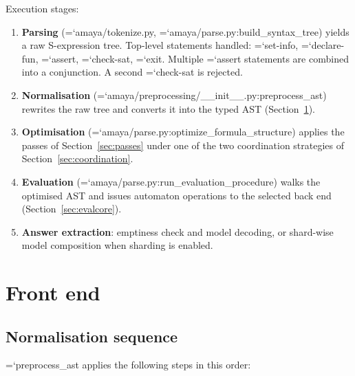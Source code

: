 \documentclass[10pt,a4paper]{article}
\newcommand{\code}[1]{{\small\ttfamily\hyphenchar\font=`\-\relax #1}}
\begin{document}
Execution stages:

\begin{enumerate}
  \item \textbf{Parsing} (\code{amaya/tokenize.py}, \code{amaya/parse.py:\allowbreak build\_\allowbreak syntax\_\allowbreak tree}) yields a
        raw S-expression tree.  Top-level statements handled: \code{set-info}, \code{declare-fun},
        \code{assert}, \code{check-sat}, \code{exit}.  Multiple \code{assert} statements are combined
        into a conjunction.  A second \code{check-sat} is rejected.
  \item \textbf{Normalisation} (\code{amaya/preprocessing/\_\allowbreak \_\allowbreak init\_\allowbreak \_\allowbreak .py:\allowbreak preprocess\_\allowbreak ast}) rewrites
        the raw tree and converts it into the typed AST (Section~\ref{sec:frontend}).
  \item \textbf{Optimisation} (\code{amaya/parse.py:\allowbreak optimize\_\allowbreak formula\_\allowbreak structure}) applies the passes
        of Section~\ref{sec:passes} under one of the two coordination strategies of
        Section~\ref{sec:coordination}.
  \item \textbf{Evaluation} (\code{amaya/parse.py:\allowbreak run\_\allowbreak evaluation\_\allowbreak procedure}) walks the optimised AST
        and issues automaton operations to the selected back end (Section~\ref{sec:evalcore}).
  \item \textbf{Answer extraction}: emptiness check and model decoding, or shard-wise model
        composition when sharding is enabled.
\end{enumerate}

\section{Front end}
\label{sec:frontend}

\subsection{Normalisation sequence}

\code{preprocess\_ast} applies the following steps in this order:
\end{document}
